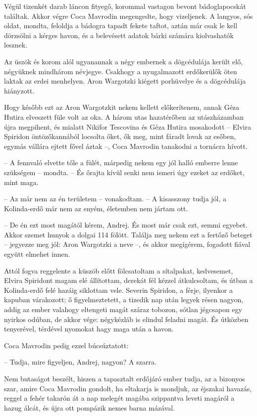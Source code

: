 \documentclass{IEEEtran}
\begin{document}
Végül tizenkét darab láncon fityegő, korommal vastagon bevont bádoglapocskát
találtak. Akkor végre Coca Mavrodin megengedte, hogy vizeljenek. A langyos,
sós oldat, mondta, feloldja a bádogra tapadt fekete taftot, aztán már csak le
kell dörzsölni a kérges havon, és a belevésett adatok bárki számára
kiolvashatók lesznek.

Az üszök és korom alól ugyanannak a négy embernek a dögcédulája került elő,
négyüknek mindhárom névjegye. Csakhogy a nyugalmazott erdőkerülők öten laktak
az erdei menhelyen. Aron Wargotzki kiégett porhüvelye és a dögcédulája
hiányzott.

Hogy később ezt az Aron Wargotzkit nekem kellett előkerítenem, annak Géza
Hutira elveszett füle volt az oka. A három utas hazatérőben az utászházamban
újra megpihent, és mialatt Nikifor Tescovina és Géza Hutira mosakodott –
Elvira Spiridon öntözőkannából locsolta őket, ők meg, mint fáradt lovak az
esőben, egymás vállára ejtett fővel áztak –, Coca Mavrodin tanakodni a
tornácra hívott.

– A fennvaló elvette tőle a fülét, márpedig nekem egy jól halló emberre lenne
szükségem – mondta. – És őrajta kívül senki nem ismeri úgy ezeket az erdőket,
mint maga.

– Az már nem az én területem – vonakodtam. – A kisasszony tudja jól, a
Kolinda-erdő már nem az enyém, életemben nem jártam ott.

– De én ezt most magától kérem, Andrej. És most már csak ezt, semmi egyebet.
Akkor szemet hunyok a dolgai 114 fölött. Találja meg nekem ezt a fertőző
beteget – jegyezze meg jól: Aron Wargotzki a neve –, és akkor megígérem,
fogadott fiával együtt elmehet innen.

Attól fogva reggelente a küszöb előtt fölcsatoltam a sítalpakat, kedvesemet,
Elvira Spiridont magam elé állítottam, derekát fél kézzel átkulcsoltam, és
útban a Kolinda-erdő felé hazáig siklottam vele. Severin Spiridon, a férje,
ilyenkor a kapuban várakozott; ő figyelmeztetett, a tizedik nap után legyek
résen nagyon, addig az ember valahogy eltengeti magát száraz tobozon, sótlan
jégcsapon egy nyirkos odúban, de akkor vége: négykézláb is elindul feladni
magát. És útközben tenyerével, térdével nyomokat hagy maga után a havon.

Coca Mavrodin pedig ezzel búcsúztatott:

– Tudja, mire figyeljen, Andrej, nagyon? A szarra.

Nem butaságot beszélt, hiszen a tapasztalt erdőjáró ember tudja, az a bizonyos
szar, amire Coca Mavrodin gondolt, ha eltakarja is mondjuk, az éjszakai
havazás, reggel a fehér takarón át a nap melegét magába szippantva leveti
magáról a hazug álcát, és újra ott pompázik nemes barna mázával.
\end{document}
